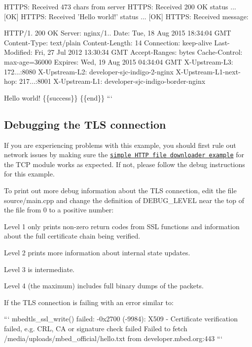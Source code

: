 \begin{DoxyEnumerate}
H\-T\-T\-P\-S\-: Received 473 chars from server H\-T\-T\-P\-S\-: Received 200 O\-K status ... \mbox{[}O\-K\mbox{]} H\-T\-T\-P\-S\-: Received 'Hello world!' status ... \mbox{[}O\-K\mbox{]} H\-T\-T\-P\-S\-: Received message\-:

H\-T\-T\-P/1. 200 O\-K Server\-: nginx/1.. Date\-: Tue, 18 Aug 2015 18\-:34\-:04 G\-M\-T Content-\/\-Type\-: text/plain Content-\/\-Length\-: 14 Connection\-: keep-\/alive Last-\/\-Modified\-: Fri, 27 Jul 2012 13\-:30\-:34 G\-M\-T Accept-\/\-Ranges\-: bytes Cache-\/\-Control\-: max-\/age=36000 Expires\-: Wed, 19 Aug 2015 04\-:34\-:04 G\-M\-T X-\/\-Upstream-\/\-L3\-: 172...\-:8080 X-\/\-Upstream-\/\-L2\-: developer-\/sjc-\/indigo-\/2-\/nginx X-\/\-Upstream-\/\-L1-\/next-\/hop\-: 217...\-:8001 X-\/\-Upstream-\/\-L1\-: developer-\/sjc-\/indigo-\/border-\/nginx

Hello world! \{\{success\}\} \{\{end\}\} ```
\end{DoxyEnumerate}

\subsection*{Debugging the T\-L\-S connection}

If you are experiencing problems with this example, you should first rule out network issues by making sure the \href{https://github.com/ARMmbed/mbed-example-network-private/tree/maste r/test/helloworld-tcpclient}{\tt simple H\-T\-T\-P file downloader example} for the T\-C\-P module works as expected. If not, please follow the debug instructions for this example.

To print out more debug information about the T\-L\-S connection, edit the file {\ttfamily source/main.\-cpp} and change the definition of {\ttfamily D\-E\-B\-U\-G\-\_\-\-L\-E\-V\-E\-L} near the top of the file from 0 to a positive number\-:
\begin{DoxyItemize}
\item Level 1 only prints non-\/zero return codes from S\-S\-L functions and information about the full certificate chain being verified.
\item Level 2 prints more information about internal state updates.
\item Level 3 is intermediate.
\item Level 4 (the maximum) includes full binary dumps of the packets.
\end{DoxyItemize}

If the T\-L\-S connection is failing with an error similar to\-: \begin{DoxyVerb}```
mbedtls_ssl_write() failed: -0x2700 (-9984): X509 - Certificate verification failed, e.g. CRL, CA or signature check failed
Failed to fetch /media/uploads/mbed_official/hello.txt from developer.mbed.org:443
```
\end{DoxyVerb}


